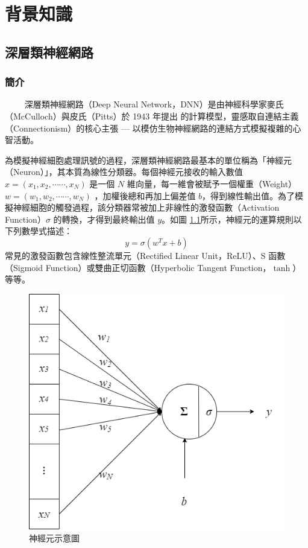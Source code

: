 
\chapter{背景知識}

\section{深層類神經網路}

\subsection{簡介}

　　
深層類神經網路（Deep Neural Network，DNN）是由神經科學家麥氏（McCulloch）與皮氏（Pitts）於 1943 年提出 \cite{mcculloch_logical_1943} 的計算模型，靈感取自連結主義（Connectionism）的核心主張 --- 以模仿生物神經網路的連結方式模擬複雜的心智活動。






 
為模擬神經細胞處理訊號的過程，深層類神經網路最基本的單位稱為「神經元（Neuron）」，其本質為線性分類器。每個神經元接收的輸入數值 $x = (x_1, x_2, \cdots\cdots, x_N)$ 是一個 $N$ 維向量，每一維會被賦予一個權重（Weight） $w = (w_1, w_2, \cdots\cdots, w_N)$  ，加權後總和再加上偏差值 $b$，得到線性輸出值。為了模擬神經細胞的觸發過程，該分類器常被加上非線性的激發函數（Activation Function）$\sigma$ 的轉換，才得到最終輸出值 $y$。如圖 \ref{fig:single-neuron}所示，神經元的運算規則以下列數學式描述：
$$y = \sigma(w^T x + b)$$
常見的激發函數包含線性整流單元（Rectified Linear Unit，ReLU）、S 函數（Sigmoid Function）或雙曲正切函數（Hyperbolic Tangent Function，$\tanh$）等等。


\begin{figure}
    \centering
    \includegraphics[width=0.5\linewidth]{figures/neuron.drawio.png}
    \caption{神經元示意圖}
    \label{fig:single-neuron}
\end{figure}


